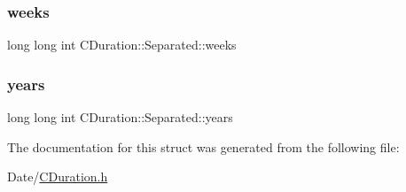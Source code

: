 \subsubsection{\texorpdfstring{weeks}{weeks}}
{\footnotesize\ttfamily long long int C\+Duration\+::\+Separated\+::weeks}

\mbox{\label{struct_c_duration_1_1_separated_acbdcab6679092f3db70f9bc804757764}} 
\subsubsection{\texorpdfstring{years}{years}}
{\footnotesize\ttfamily long long int C\+Duration\+::\+Separated\+::years}



The documentation for this struct was generated from the following file\+:\begin{DoxyCompactItemize}
\item 
Date/\mbox{\hyperlink{_c_duration_8h}{C\+Duration.\+h}}\end{DoxyCompactItemize}
